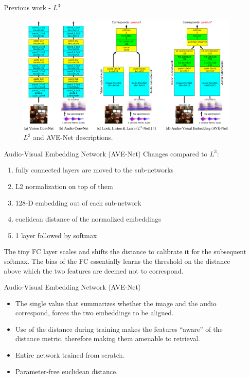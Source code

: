 \documentclass{beamer}
\begin{document}
\begin{frame}{Previous work - $L^3$}
\begin{figure}[h]
\includegraphics[width=\textwidth]{img/ave-net}
\caption{$L^3$ and AVE-Net descriptions.}
\end{figure}

\end{frame}
\begin{frame}{Audio-Visual Embedding Network (AVE-Net)}
Changes compared to $L^3$:
\begin{enumerate}
\item fully connected layers are moved to the sub-networks
\item L2 normalization on top of them
\item 128-D embedding out of each sub-network
\item euclidean distance of the normalized embeddings
\item 1 layer followed by softmax 
\end{enumerate}

\vfill

The tiny FC layer scales and shifts the distance to
calibrate it for the subsequent softmax. The bias of the FC
essentially learns the threshold on the distance above which
the two features are deemed not to correspond.
\end{frame}
\begin{frame}{Audio-Visual Embedding Network (AVE-Net)}

\begin{itemize}
\item The single
value that summarizes whether the image and the audio correspond,
forces the two embeddings to be aligned.
\item Use of the distance during training makes the features “aware” of the distance metric,
therefore making them amenable to retrieval.
\item Entire network trained from scratch.
\item Parameter-free euclidean distance.
\end{itemize}


\end{frame}
\end{document}
